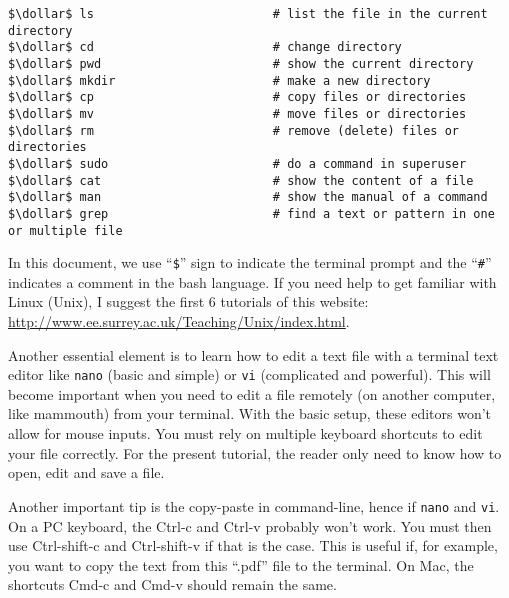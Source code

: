 \documentclass[10pt,letter]{article}
\newcommand{\dollar}{\mbox{\textdollar}}
\begin{document}
\begin{bashInput}
\begin{lstlisting}[style=BashInputStyle]
$\dollar$ ls                         # list the file in the current directory
$\dollar$ cd                         # change directory
$\dollar$ pwd                        # show the current directory
$\dollar$ mkdir                      # make a new directory
$\dollar$ cp                         # copy files or directories
$\dollar$ mv                         # move files or directories
$\dollar$ rm                         # remove (delete) files or directories
$\dollar$ sudo                       # do a command in superuser
$\dollar$ cat                        # show the content of a file
$\dollar$ man                        # show the manual of a command
$\dollar$ grep                       # find a text or pattern in one or multiple file
\end{lstlisting}
\end{bashInput}

In this document, we use ``\texttt{\$}'' sign to indicate the terminal prompt 
and the ``\texttt{\#}'' indicates a comment in the bash language.
If you need help to get familiar with Linux (Unix), I suggest the first 6 tutorials of this website: 
\url{http://www.ee.surrey.ac.uk/Teaching/Unix/index.html}.

Another essential element is to learn how to edit a text file with a terminal text editor 
like \texttt{nano}  (basic and simple) or \texttt{vi}  (complicated and powerful).
This will become important when you need to edit a file remotely (on another computer, like mammouth) from your terminal.
With the basic setup, these editors won't allow for mouse inputs.
You must rely on multiple keyboard shortcuts to edit your file correctly.
For the present tutorial, the reader only need to know how to open, edit and save a file.

Another important tip is the copy-paste in command-line, hence if \texttt{nano}  and \texttt{vi}. 
On a PC keyboard, the Ctrl-c and Ctrl-v probably won't work.
You must then use Ctrl-shift-c and Ctrl-shift-v if that is the case.
This is useful if, for example, you want to copy the text from this ``.pdf'' file to the terminal. 
On Mac, the shortcuts Cmd-c and Cmd-v should remain the same.
\end{document}
